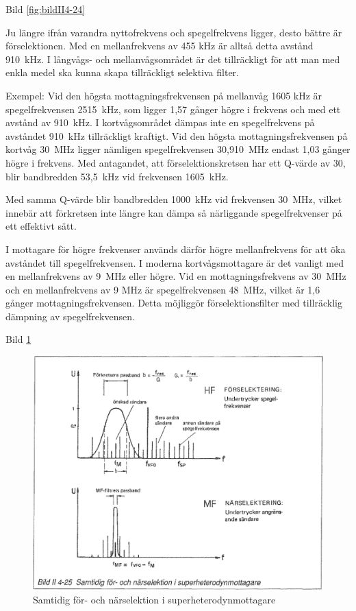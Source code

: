 Bild \ref{fig:bildII4-24}

Ju längre ifrån varandra nyttofrekvens och spegelfrekvens ligger,
desto bättre är förselektionen. Med en mellanfrekvens av 455 kHz är
alltså detta avstånd 910~kHz. I långvågs- och mellanvågsområdet är det
tillräckligt för att man med enkla medel ska kunna skapa
tillräckligt selektiva filter.

Exempel: Vid den högsta mottagningsfrekvensen på mellanvåg 1605 kHz är
spegelfrekvensen 2515~kHz, som ligger 1,57 gånger högre i frekvens och
med ett avstånd av 910~kHz. I kortvågsområdet dämpas inte en
spegelfrekvens på avståndet 910~kHz tillräckligt kraftigt. Vid den
högsta mottagningsfrekvensen på kortvåg 30~MHz ligger nämligen
spegelfrekvensen 30,910~MHz endast 1,03 gånger högre i frekvens. Med
antagandet, att förselektionskretsen har ett Q-värde av 30, blir
bandbredden 53,5~kHz vid frekvensen 1605~kHz.

Med samma Q-värde blir bandbredden 1000~kHz vid frekvensen 30~MHz,
vilket innebär att förkretsen inte längre kan dämpa så närliggande
spegelfrekvenser på ett effektivt sätt.

I mottagare för högre frekvenser används därför högre mellanfrekvens
för att öka avståndet till spegelfrekvensen. I moderna
kortvågsmottagare är det vanligt med en mellanfrekvens av 9~MHz eller
högre. Vid en mottagningsfrekvens av 30~MHz och en mellanfrekvens av 9
MHz är spegelfrekvensen 48~MHz, vilket är 1,6 gånger
mottagningsfrekvensen. Detta möjliggör förselektionsfilter med
tillräcklig dämpning av spegelfrekvensen.

Bild \ref{fig:bildII4-25}

\begin{figure}
  \includegraphics[width=\textwidth]{images/bild_2_4-25}
  \caption{Samtidig för- och närselektion i superheterodynmottagare}
  \label{fig:bildII4-25}
\end{figure}

